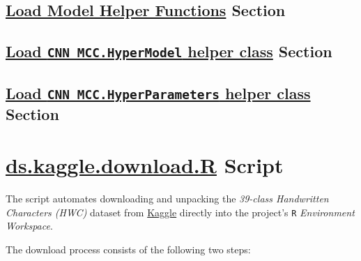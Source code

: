\documentclass[
]{report}
\begin{document}
\subsection{\texorpdfstring{\href{https://github.com/AzKurban-edX-DS/edx.capstone.choose-your-own/blob/main/r/support-scripts/setup.R\#L570-L581}{Load Model Helper Functions} Section}{Load Model Helper Functions Section}}\label{load-model-helper-functions-section}

\hfill\break

\subsection{\texorpdfstring{\href{https://github.com/AzKurban-edX-DS/edx.capstone.choose-your-own/blob/main/r/support-scripts/setup.R\#L582-L594}{Load \texttt{CNN\_MCC.HyperModel} helper class} Section}{Load CNN\_MCC.HyperModel helper class Section}}\label{load-cnn_mcc.hypermodel-helper-class-section}

\hfill\break

\subsection{\texorpdfstring{\href{https://github.com/AzKurban-edX-DS/edx.capstone.choose-your-own/blob/main/r/support-scripts/setup.R\#L595-L607}{Load \texttt{CNN\_MCC.HyperParameters} helper class} Section}{Load CNN\_MCC.HyperParameters helper class Section}}\label{load-cnn_mcc.hyperparameters-helper-class-section}

\hfill\break

\section{\texorpdfstring{\href{https://github.com/AzKurban-edX-DS/edx.capstone.choose-your-own/blob/main/r/support-scripts/ds.kaggle.download.R}{ds.kaggle.download.R} Script}{ds.kaggle.download.R Script}}\label{appndx_b.ds.kaggle.download}

\hfill\break

The script automates downloading and unpacking the \emph{39-class Handwritten Characters (HWC)} dataset from \href{https://www.kaggle.com/datasets/vaibhao/handwritten-characters}{Kaggle} directly into the project's \texttt{R} \emph{Environment Workspace}.

The download process consists of the following two steps:
\end{document}
